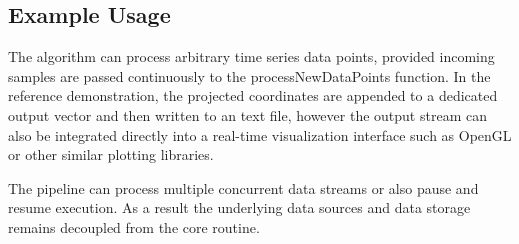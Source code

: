 \subsection{Example Usage}
The algorithm can process arbitrary time series data points, provided incoming samples are passed continuously to the processNewDataPoints function. In the reference demonstration, the projected coordinates are appended to a dedicated output vector and then written to an text file, however the output stream can also be integrated directly into a real-time visualization interface such as OpenGL or other similar plotting libraries. 

The pipeline can process multiple concurrent data streams or also pause and resume execution. As a result
the underlying data sources and data storage remains decoupled from the core routine.